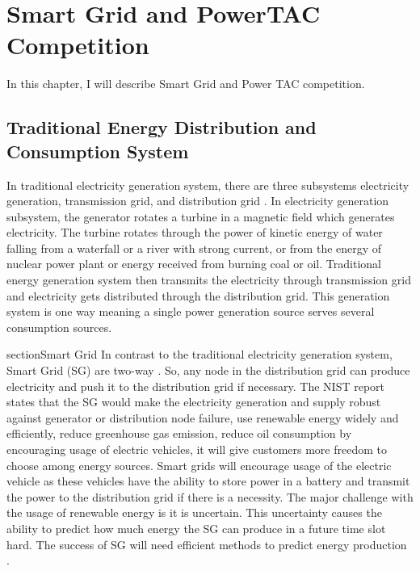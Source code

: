 
\chapter{Smart Grid and PowerTAC Competition}

In this chapter, I will describe Smart Grid and Power TAC competition.

\section{Traditional Energy Distribution and Consumption System}
In traditional electricity generation system, there are three subsystems electricity generation, transmission grid, and distribution grid \cite{fang2012smart}. In electricity generation subsystem, the generator rotates a turbine in a magnetic field which generates electricity. The turbine rotates through the power of kinetic energy of water falling from a waterfall or a river with strong current, or from the energy of nuclear power plant or energy received from burning coal or oil. Traditional energy generation system then transmits the electricity through transmission grid and electricity gets distributed through the distribution grid. This generation system is one way meaning a single power generation source serves several consumption sources.



section{Smart Grid}
In contrast to the traditional electricity generation system, Smart Grid (SG) are two-way \cite{fang2012smart}. So, any node in the distribution grid can produce electricity and push it to the distribution grid if necessary. The NIST report \cite{fang2012smart} states that the SG would make the electricity generation and supply robust against generator or distribution node failure, use renewable energy widely and efficiently, reduce greenhouse gas emission, reduce oil consumption by encouraging usage of electric vehicles, it will give customers more freedom to choose among energy sources. Smart grids will encourage usage of the electric vehicle as these vehicles have the ability to store power in a battery and transmit the power to the distribution grid if there is a necessity. The major challenge with the usage of renewable energy is it is uncertain. This uncertainty causes the ability to predict how much energy the SG can produce in a future time slot hard. The success of SG will need efficient methods to predict energy production \cite{potter2009building}.


